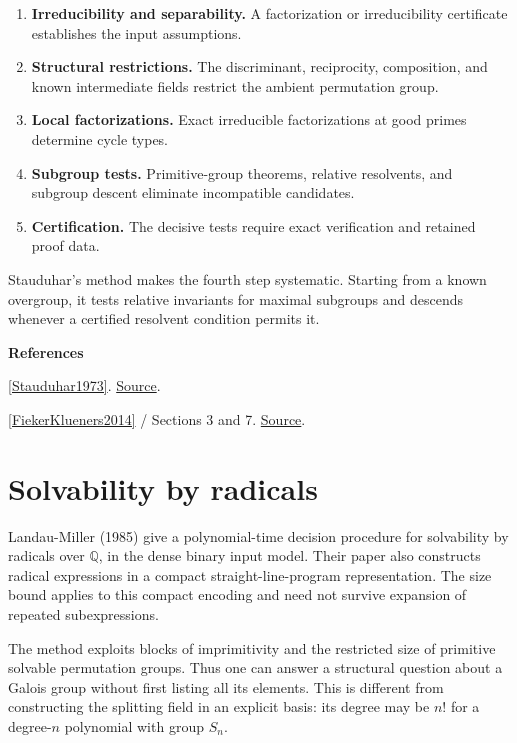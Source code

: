 \documentclass[11pt,a4paper,oneside,openany]{book}
\newenvironment{sources}{\par\smallskip\begingroup\footnotesize\color{atlasgray}\leftskip=10pt\setlength{\parskip}{2pt}}{\par\endgroup\smallskip}
\begin{document}
\begin{enumerate}
\item\leavevmode\color{black} \textbf{Irreducibility and separability.} A factorization or irreducibility certificate establishes the input assumptions.
\item\leavevmode\color{black} \textbf{Structural restrictions.} The discriminant, reciprocity, composition, and known intermediate fields restrict the ambient permutation group.
\item\leavevmode\color{black} \textbf{Local factorizations.} Exact irreducible factorizations at good primes determine cycle types.
\item\leavevmode\color{black} \textbf{Subgroup tests.} Primitive-group theorems, relative resolvents, and subgroup descent eliminate incompatible candidates.
\item\leavevmode\color{black} \textbf{Certification.} The decisive tests require exact verification and retained proof data.
\end{enumerate}
\color{black} Stauduhar's method makes the fourth step systematic. Starting from a known overgroup, it tests relative invariants for maximal subgroups and descends whenever a certified resolvent condition permits it.\par
\begin{sources}
\textbf{References}\par\smallskip
\noindent\hyperlink{ref:Stauduhar1973}{[Stauduhar1973]}.  \href{https://doi.org/10.1090/S0025-5718-1973-0327712-4}{Source}.\par
\noindent\hyperlink{ref:FiekerKlueners2014}{[FiekerKlueners2014]} / Sections 3 and 7.  \href{https://doi.org/10.1112/S1461157013000302}{Source}.\par
\end{sources}\color{black}
\section{Solvability by radicals}
\color{black} Landau-Miller (1985) give a polynomial-time decision procedure for solvability by radicals over \(\mathbb Q\), in the dense binary input model. Their paper also constructs radical expressions in a compact straight-line-program representation. The size bound applies to this compact encoding and need not survive expansion of repeated subexpressions.\par
\color{black} The method exploits blocks of imprimitivity and the restricted size of primitive solvable permutation groups. Thus one can answer a structural question about a Galois group without first listing all its elements. This is different from constructing the splitting field in an explicit basis: its degree may be \(n!\) for a degree-\(n\) polynomial with group \(S_n\).\par
\end{document}
